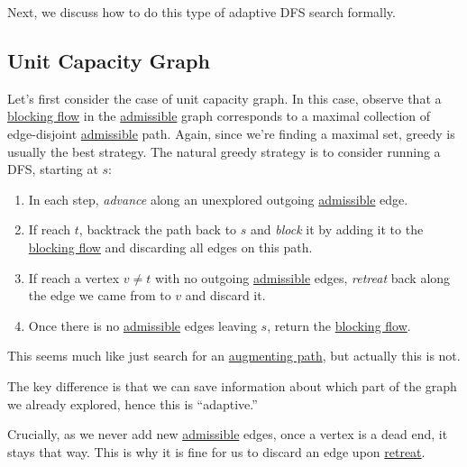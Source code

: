 Next, we discuss how to do this type of adaptive DFS search formally.

\subsection{Unit Capacity Graph}
Let's first consider the case of unit capacity graph. In this case, observe that a \hyperref[def:blocking-flow]{blocking flow} in the \hyperref[def:admissible]{admissible} graph corresponds to a maximal collection of edge-disjoint \hyperref[def:admissible]{admissible} path. Again, since we're finding a maximal set, greedy is usually the best strategy. The natural greedy strategy is to consider running a DFS, starting at \(s\):
\begin{enumerate}
	\item\label{algo:unit-adaptive-DFS-advance} In each step, \emph{advance} along an unexplored outgoing \hyperref[def:admissible]{admissible} edge.
	\item\label{algo:unit-adaptive-DFS-block} If reach \(t\), backtrack the path back to \(s\) and \emph{block} it by adding it to the \hyperref[def:blocking-flow]{blocking flow} and discarding all edges on this path.
	\item\label{algo:unit-adaptive-DFS-retreat} If reach a vertex \(v \neq t\) with no outgoing \hyperref[def:admissible]{admissible} edges, \emph{retreat} back along the edge we came from to \(v\) and discard it.
	\item Once there is no \hyperref[def:admissible]{admissible} edges leaving \(s\), return the \hyperref[def:blocking-flow]{blocking flow}.
\end{enumerate}

This seems much like just search for an \hyperref[def:augmenting-path]{augmenting path}, but actually this is not.

\begin{intuition}
	The key difference is that we can save information about which part of the graph we already explored, hence this is ``adaptive.''
\end{intuition}

Crucially, as we never add new \hyperref[def:admissible]{admissible} edges, once a vertex is a dead end, it stays that way. This is why it is fine for us to discard an edge upon \hyperref[algo:unit-adaptive-DFS-retreat]{retreat}.

